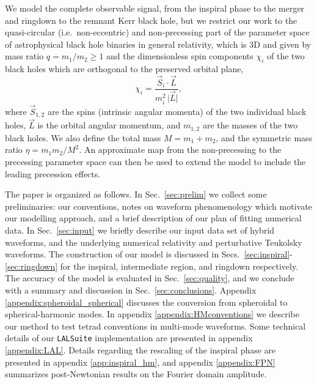 \documentclass[twocolumn,prd,aps,superscriptaddress,preprintnumbers,tightenlines,showpacs,nofootinbib,eqsecnum,amsfonts,amsmath]{revtex4}
\begin{document}
We model the complete observable signal, from the inspiral phase to the merger and ringdown to the remnant Kerr black hole, but we restrict our work to the quasi-circular (i.e.~non-eccentric) and non-precessing part of the parameter space of astrophysical black hole binaries in general relativity, which is 3D and given by mass ratio $q = m_1/m_2 \geq 1$ and the dimensionless spin components $\chi_i $ of the two black holes which are orthogonal to the preserved orbital plane,
\begin{equation}
\chi_i = \frac{\vec S_i \cdot \vec L}{m_i^2 \, \vert \vec L\vert},
\end{equation}
where  $\vec S_{1,2}$  are the spins (intrinsic angular momenta) of the two individual black holes, $\vec L$ is the orbital angular momentum, and  $m_{1,2}$ are the masses of the two black holes.
We also define the total mass $M=m_1+m_2$, and the symmetric mass ratio $\eta = m_1 m_2 /M^2$.
An approximate map from the non-precessing to the precessing parameter space \cite{Schmidt:2012rh,Hannam:2013oca,Khan:2018fmp} can then be used  to extend the model to include the leading precession effects. 

The paper is organized as follows.
%
In Sec.~\ref{sec:prelim} we collect some preliminaries: our conventions, notes on waveform phenomenology which motivate our modelling approach, and a brief description of our plan of fitting numerical data.
%
In Sec.~\ref{sec:input} we briefly describe our input data set of hybrid waveforms, and the underlying numerical relativity and perturbative  Teukolsky waveforms.
%
The construction of our model is discussed in Secs.~\ref{sec:inspiral}-\ref{sec:ringdown} for the inspiral, intermediate region, and ringdown respectively. 
%
The accuracy of the model is evaluated in Sec.~\ref{sec:quality}, and we conclude with a summary and discussion in
Sec.~\ref{sec:conclusions}. 
%
Appendix \ref{appendix:spheroidal_spherical} discusses the conversion from spheroidal to spherical-harmonic modes. 
%
In appendix \ref{appendix:HMconventions} we describe our method to test tetrad conventions in  multi-mode waveforms. Some technical details of our \texttt{LALSuite}
\cite{lalsuite} implementation are presented in appendix \ref{appendix:LAL}.
%
Details regarding the rescaling of the inspiral phase are presented in
appendix \ref{app:inspiral_hm}, and appendix \ref{appendix:FPN} summarizes post-Newtonian results on the Fourier domain amplitude.



\end{document}
